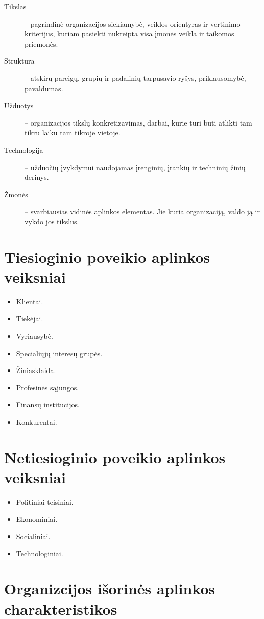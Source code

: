\begin{description}
  \item[Tikslas] – pagrindinė organizacijos siekiamybė, veiklos orientyras
    ir vertinimo kriterijus, kuriam pasiekti nukreipta visa įmonės veikla
    ir taikomos priemonės.
  \item[Struktūra] – atskirų pareigų, grupių ir padalinių tarpusavio
    ryšys, priklausomybė, pavaldumas.
  \item[Užduotys] – organizacijos tikslų konkretizavimas, darbai, kurie
    turi būti atlikti tam tikru laiku tam tikroje vietoje.
  \item[Technologija] – užduočių įvykdymui naudojamas įrenginių, įrankių
    ir techninių žinių derinys.
  \item[Žmonės] – svarbiausias vidinės aplinkos elementas. Jie kuria
    organizaciją, valdo ją ir vykdo jos tikslus.
\end{description}

\section{Tiesioginio poveikio aplinkos veiksniai}

\begin{itemize}
  \item Klientai.
  \item Tiekėjai.
  \item Vyriausybė.
  \item Specialiųjų interesų grupės.
  \item Žiniasklaida.
  \item Profesinės sąjungos.
  \item Finansų institucijos.
  \item Konkurentai.
\end{itemize}

\section{Netiesioginio poveikio aplinkos veiksniai}

\begin{itemize}
  \item Politiniai-teisiniai.
  \item Ekonominiai.
  \item Socialiniai.
  \item Technologiniai.
\end{itemize}

\section{Organizcijos išorinės aplinkos charakteristikos}

